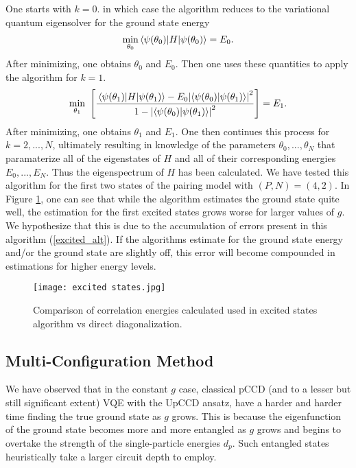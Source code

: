 \documentclass[Dual]{msu-thesis}
\begin{document}
One starts with $k=0$. in which case the algorithm reduces to the variational quantum eigensolver for the ground state energy
\begin{align}
\underset{\theta_0}{\min}\mel{\psi(\theta_0)}{H}{\psi(\theta_0)}=E_0
.\end{align}
After minimizing, one obtains $\theta_0$ and $E_0$. Then one uses these quantities to apply the algorithm for $k=1$.
\begin{align}
\underset{\theta_1}{\min} \  \left[\frac{\mel{\psi(\theta_1)}{H}{\psi(\theta_1)}-E_0\abs{\bra{\psi(\theta_0)}\ket{\psi(\theta_1)}}^2}{1-\abs{\bra{\psi(\theta_0)}\ket{\psi(\theta_1)}}^2}\right]=E_1
.\end{align}
After minimizing, one obtains $\theta_1$ and $E_1$. One then continues this process for $k=2,...,N$, ultimately resulting in knowledge of the parameters $\theta_0,...,\theta_N$ that paramaterize all of the eigenstates of $H$ and all of their corresponding energies $E_0,...,E_N$. Thus the eigenspectrum of $H$ has been calculated. We have tested this algorithm for the first two states of the pairing model with $(P,N)=(4,2)$. In Figure \ref{fig:excited states}, one can see that while the algorithm estimates the ground state quite well, the estimation for the first excited states grows worse for larger values of $g$. We hypothesize that this is due to the accumulation of errors present in this algorithm (\ref{excited_alt}). If the algorithms estimate for the ground state energy and/or the ground state are slightly off, this error will become compounded in estimations for higher energy levels.

\begin{figure}
    \centering
    \texttt{[image: excited states.jpg]}
    \caption{Comparison of correlation energies calculated used in excited states algorithm vs direct diagonalization.}
    \label{fig:excited states}
\end{figure}

\subsection{Multi-Configuration Method}
\label{subsec:multi_conf}

We have observed that in the constant $g$ case, classical pCCD (and to a lesser but still significant extent) VQE with the UpCCD ansatz, have a harder and harder time finding the true ground state as $g$ grows. This is because the eigenfunction of the ground state becomes more and more entangled as $g$ grows and begins to overtake the strength of the single-particle energies $d_p$. Such entangled states heuristically take a larger circuit depth to employ.
\end{document}
